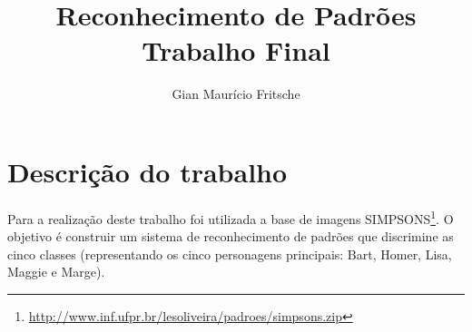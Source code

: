 \documentclass[journal]{IEEEtran}
\begin{document}
\title{Reconhecimento de Padrões\\ Trabalho Final}

\author{Gian Maurício Fritsche}

\maketitle

\IEEEpeerreviewmaketitle

\section{Descrição do trabalho}

Para a realização deste trabalho foi utilizada a base de imagens SIMPSONS\footnote{\url{http://www.inf.ufpr.br/lesoliveira/padroes/simpsons.zip}}.
O objetivo é construir um sistema de reconhecimento de padrões que discrimine as cinco classes (representando os cinco personagens principais: Bart, Homer, Lisa, Maggie e Marge).
\end{document}
